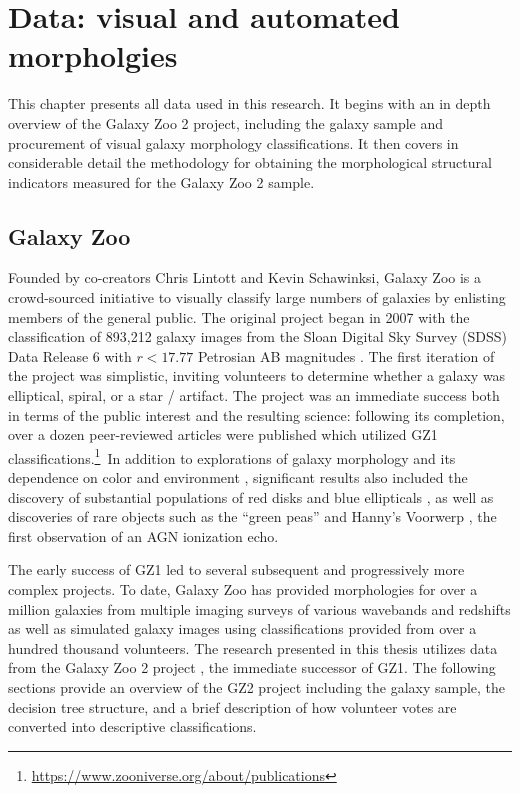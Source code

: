 
\chapter{Data: visual and automated morpholgies}
\label{chap2}


This chapter presents all data used in this research. It begins with an in depth overview of the Galaxy Zoo 2 project, including the galaxy sample and procurement of visual galaxy morphology classifications. It then covers in considerable detail the methodology for obtaining the morphological structural indicators measured for the Galaxy Zoo 2 sample. 


\section{Galaxy Zoo}

Founded by co-creators Chris Lintott and Kevin Schawinksi, Galaxy Zoo is a crowd-sourced initiative to visually classify large numbers of galaxies by enlisting members of the general public. The original project \citep[GZ1,][]{Lintott2008} began in 2007 with the classification of 893,212 galaxy images from the Sloan Digital Sky Survey (SDSS) Data Release 6 with $r < 17.77$ Petrosian AB magnitudes \citep{Strauss2002,Adelman2008}. The first iteration of the project was simplistic, inviting volunteers to determine whether a galaxy was elliptical, spiral, or a star / artifact. The project was an immediate success both in terms of the public interest and the resulting science: following its completion, over a dozen peer-reviewed articles were published which utilized GZ1 classifications.\footnote{\url{https://www.zooniverse.org/about/publications}}~In addition to explorations of galaxy morphology and its dependence on color and environment \citep{Skibba2009, Bamford2009}, significant results also included the discovery of substantial populations of red disks \citep{Masters2010b} and blue ellipticals \citep{Schawinski2009}, as well as discoveries of rare objects such as the ``green peas'' \citep{Cardamone2009} and Hanny's Voorwerp \citep{Lintott2009}, the first observation of an AGN ionization echo. 

The early success of GZ1 led to several subsequent and progressively more complex projects. To date, Galaxy Zoo has provided morphologies for over a million galaxies from multiple imaging surveys of various wavebands and redshifts as well as simulated galaxy images using classifications provided from over a hundred thousand volunteers. The research presented in this thesis utilizes data from the Galaxy Zoo 2 project \citep[GZ2,][]{Willett2013}, the immediate successor of GZ1. The following sections provide an overview of the GZ2 project including the galaxy sample, the decision tree structure, and a brief description of how volunteer votes are converted into descriptive classifications. 

